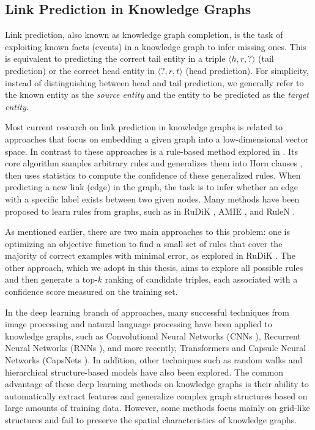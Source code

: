 \subsection{Link Prediction in Knowledge Graphs}


Link prediction, also known as knowledge graph completion, is the task of exploiting known facts (events) in a knowledge graph to infer missing ones. This is equivalent to predicting the correct tail entity in a triple $\langle h, r, ? \rangle$ (tail prediction) or the correct head entity in $\langle ?, r, t \rangle$ (head prediction). For simplicity, instead of distinguishing between head and tail prediction, we generally refer to the known entity as the \textit{source entity} and the entity to be predicted as the \textit{target entity}.

Most current research on link prediction in knowledge graphs is related to approaches that focus on embedding a given graph into a low-dimensional vector space. In contrast to these approaches is a rule-based method explored in \cite{burl}. Its core algorithm samples arbitrary rules and generalizes them into Horn clauses \cite{wiki:Horn}, then uses statistics to compute the confidence of these generalized rules. When predicting a new link (edge) in the graph, the task is to infer whether an edge with a specific label exists between two given nodes. Many methods have been proposed to learn rules from graphs, such as in RuDiK \cite{ortona2018robust}, AMIE \cite{galarraga2015fast}, and RuleN \cite{meilicke2018fine}.

As mentioned earlier, there are two main approaches to this problem: one is optimizing an objective function to find a small set of rules that cover the majority of correct examples with minimal error, as explored in RuDiK \cite{ortona2018robust}. The other approach, which we adopt in this thesis, aims to explore all possible rules and then generate a top-\(k\) ranking of candidate triples, each associated with a confidence score measured on the training set.

In the deep learning branch of approaches, many successful techniques from image processing and natural language processing have been applied to knowledge graphs, such as Convolutional Neural Networks (CNNs \cite{lecun1999object}), Recurrent Neural Networks (RNNs \cite{hopfield2007hopfield}), and more recently, Transformers \cite{yang2019xlnet} and Capsule Neural Networks (CapsNets \cite{sabour2017dynamic}). In addition, other techniques such as random walks and hierarchical structure-based models have also been explored. The common advantage of these deep learning methods on knowledge graphs is their ability to automatically extract features and generalize complex graph structures based on large amounts of training data. However, some methods focus mainly on grid-like structures and fail to preserve the spatial characteristics of knowledge graphs.

